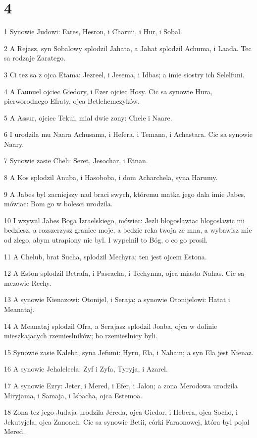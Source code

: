 \chapter{4}

\par 1 Synowie Judowi: Fares, Hesron, i Charmi, i Hur, i Sobal.
\par 2 A Rejasz, syn Sobalowy splodzil Jahata, a Jahat splodzil Achuma, i Laada. Tec sa rodzaje Zaratego.
\par 3 Ci tez sa z ojca Etama: Jezreel, i Jesema, i Idbas; a imie siostry ich Selelfuni.
\par 4 A Faunuel ojciec Giedory, i Ezer ojciec Hosy. Cic sa synowie Hura, pierworodnego Efraty, ojca Betlehemczyków.
\par 5 A Assur, ojciec Tekui, mial dwie zony: Chele i Naare.
\par 6 I urodzila mu Naara Achusama, i Hefera, i Temana, i Achastara. Cic sa synowie Naary.
\par 7 Synowie zasie Cheli: Seret, Jesochar, i Etnan.
\par 8 A Kos splodzil Anuba, i Hasoboba, i dom Acharchela, syna Harumy.
\par 9 A Jabes byl zacniejszy nad braci swych, któremu matka jego dala imie Jabes, mówiac: Bom go w bolesci urodzila.
\par 10 I wzywal Jabes Boga Izraelskiego, mówiec: Jezli blogoslawiac blogoslawic mi bedziesz, a rozszerzysz granice moje, a bedzie reka twoja ze mna, a wybawisz mie od zlego, abym utrapiony nie byl. I wypelnil to Bóg, o co go prosil.
\par 11 A Chelub, brat Sucha, splodzil Mechyra; ten jest ojcem Estona.
\par 12 A Eston splodzil Betrafa, i Paseacha, i Techynna, ojca miasta Nahas. Cic sa mezowie Rechy.
\par 13 A synowie Kienazowi: Otonijel, i Seraja; a synowie Otonijelowi: Hatat i Meanataj.
\par 14 A Meanataj splodzil Ofra, a Serajasz splodzil Joaba, ojca w dolinie mieszkajacych rzemieslników; bo rzemieslnicy byli.
\par 15 Synowie zasie Kaleba, syna Jefumi: Hyru, Ela, i Nahain; a syn Ela jest Kienaz.
\par 16 A synowie Jehaleleela: Zyf i Zyfa, Tyryja, i Azarel.
\par 17 A synowie Ezry: Jeter, i Mered, i Efer, i Jalon; a zona Merodowa urodzila Miryjama, i Samaja, i Isbacha, ojca Estemoa.
\par 18 Zona tez jego Judaja urodzila Jereda, ojca Giedor, i Hebera, ojca Socho, i Jekutyjela, ojca Zanoach. Cic sa synowie Betii, córki Faraonowej, która byl pojal Mered.
